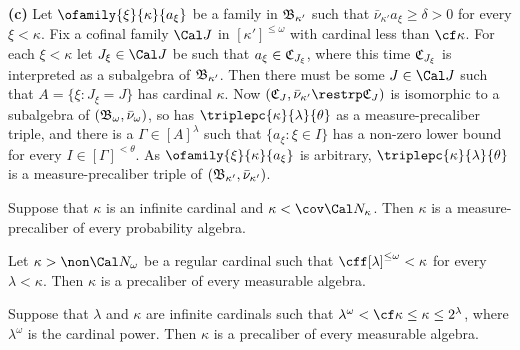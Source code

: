 {{\bf (c)} Let $\ofamily{\xi}{\kappa}{a_{\xi}}$ be a family in
$\frak B_{\kappa'}$ such that $\bar\nu_{\kappa'}a_{\xi}\ge\delta>0$ for
every $\xi<\kappa$.   Fix a cofinal family $\Cal J$ in
$[\kappa']^{\le\omega}$ with cardinal less than $\cf\kappa$.
For each $\xi<\kappa$ let $J_{\xi}\in\Cal J$ be such that
$a_{\xi}\in\frak C_{J_{\xi}}$, where this time $\frak C_{J_{\xi}}$ is
interpreted as a subalgebra of $\frak B_{\kappa'}$.   Then there must be
some $J\in\Cal J$ such that $A=\{\xi:J_{\xi}=J\}$ has cardinal $\kappa$.
Now $(\frak C_J,\bar\nu_{\kappa'}\restrp\frak C_J)$ is isomorphic to a
subalgebra of $(\frak B_{\omega},\bar\nu_{\omega})$, so has
$\triplepc{\kappa}{\lambda}{\theta}$ as a measure-precaliber triple, and
there is a $\Gamma\in[A]^{\lambda}$ such that $\{a_{\xi}:\xi\in I\}$ has
a non-zero lower bound for every $I\in[\Gamma]^{<\theta}$.   As
$\ofamily{\xi}{\kappa}{a_{\xi}}$ is arbitrary,
$\triplepc{\kappa}{\lambda}{\theta}$ is a measure-precaliber triple of
$(\frak B_{\kappa'},\bar\nu_{\kappa'})$.
}%

 Suppose that $\kappa$ is an infinite cardinal
and $\kappa<\cov\Cal N_{\kappa}$.   Then $\kappa$ is a
measure-precaliber of every probability algebra.


 Let $\kappa>\non\Cal N_{\omega}$ be a regular
cardinal such that $\cff[\lambda]^{\le\omega}<\kappa$ for every
$\lambda<\kappa$.
Then $\kappa$ is a precaliber of every measurable algebra.


Suppose that $\lambda$ and $\kappa$ are infinite cardinals such
that $\lambda^{\omega}<\cf\kappa\le\kappa\le 2^{\lambda}${, where
$\lambda^{\omega}$ is the cardinal power}.   Then
$\kappa$ is a precaliber of every measurable algebra.

